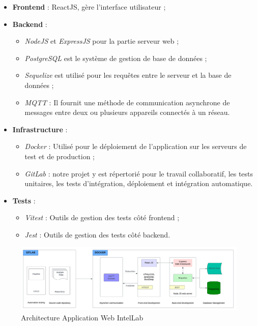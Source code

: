 \begin{itemize}
	\item \textbf{Frontend} : ReactJS, gère l’interface utilisateur ;
	\item \textbf{Backend} :
	      \begin{itemize}
		      \item \textit{NodeJS} et \textit{ExpressJS} pour la partie serveur web ;
		      \item \textit{PostgreSQL} est le système de gestion de base de données ;
		      \item \textit{Sequelize} est utilisé pour les requêtes entre le serveur et la base de données ;
		      \item \textit{MQTT} : Il fournit une méthode de communication asynchrone de messages entre deux ou plusieurs appareils connectés à un réseau.
	      \end{itemize}
	\item \textbf{Infrastructure} :
	      \begin{itemize}
		      \item \textit{Docker} : Utilisé pour le déploiement de l’application sur les serveurs de test et de production ;
		      \item \textit{GitLab} : notre projet y est répertorié pour le travail collaboratif, les tests unitaires, les tests d’intégration, déploiement et intégration automatique.
	      \end{itemize}
	\item \textbf{Tests} :
	      \begin{itemize}
		      \item \textit{Vitest} : Outils de gestion des tests côté frontend ;
		      \item \textit{Jest} : Outils de gestion des tests côté backend.
	      \end{itemize}
\end{itemize}


\begin{figure}[h]
	\center%
	\includegraphics[width=\textwidth]{./images/architectur_intellab.png}
	\caption[Architecture Application Web IntelLab]{Architecture Application Web IntelLab}\label{fig:architectur_intellab}
\end{figure}


